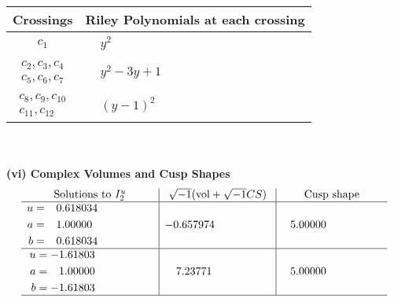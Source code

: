 \documentclass[1p]{elsarticle_modified}
\theoremstyle{definition}
\newcommand{\I}{\sqrt{-1}}
\begin{document}
\begin{tabular}{m{50pt}|m{274pt}}
Crossings & \hspace{64pt}Riley Polynomials at each crossing \\
\hline $$\begin{aligned}c_{1}\end{aligned}$$&$\begin{aligned}
&y^2
\end{aligned}$\\
\hline $$\begin{aligned}c_{2},c_{3},c_{4}\\c_{5},c_{6},c_{7}\end{aligned}$$&$\begin{aligned}
&y^2-3 y+1
\end{aligned}$\\
\hline $$\begin{aligned}c_{8},c_{9},c_{10}\\c_{11},c_{12}\end{aligned}$$&$\begin{aligned}
&(y-1)^2
\end{aligned}$\\
\hline
\end{tabular}\\~\\
\newpage\flushleft \textbf{(vi) Complex Volumes and Cusp Shapes}
$$\begin{array}{c|c|c}  
\text{Solutions to }I^u_{2}& \I (\text{vol} + \sqrt{-1}CS) & \text{Cusp shape}\\
 \hline 
\begin{aligned}
u &= \phantom{-}0.618034\phantom{ +0.000000I} \\
a &= \phantom{-}1.00000\phantom{ +0.000000I} \\
b &= \phantom{-}0.618034\phantom{ +0.000000I}\end{aligned}
 & -0.657974\phantom{ +0.000000I} & \phantom{-}5.00000\phantom{ +0.000000I} \\ \hline\begin{aligned}
u &= -1.61803\phantom{ +0.000000I} \\
a &= \phantom{-}1.00000\phantom{ +0.000000I} \\
b &= -1.61803\phantom{ +0.000000I}\end{aligned}
 & \phantom{-}7.23771\phantom{ +0.000000I} & \phantom{-}5.00000\phantom{ +0.000000I}\\
 \hline 
 \end{array}$$\newpage\newpage\renewcommand{\arraystretch}{1}
\end{document}
